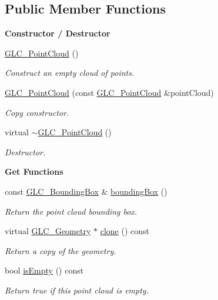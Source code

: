 \subsection*{Public Member Functions}
\begin{Indent}{\bf Constructor / Destructor}\par
\begin{DoxyCompactItemize}
\item 
\hyperlink{class_g_l_c___point_cloud_a567481289d64971308ec9a3db305af8c}{G\-L\-C\-\_\-\-Point\-Cloud} ()
\begin{DoxyCompactList}\small\item\em Construct an empty cloud of points. \end{DoxyCompactList}\item 
\hyperlink{class_g_l_c___point_cloud_a8ee88c1c53313b5fdcfd7af338e7f076}{G\-L\-C\-\_\-\-Point\-Cloud} (const \hyperlink{class_g_l_c___point_cloud}{G\-L\-C\-\_\-\-Point\-Cloud} \&point\-Cloud)
\begin{DoxyCompactList}\small\item\em Copy constructor. \end{DoxyCompactList}\item 
virtual \hyperlink{class_g_l_c___point_cloud_a7b27d306ba660757592ac3a547071328}{$\sim$\-G\-L\-C\-\_\-\-Point\-Cloud} ()
\begin{DoxyCompactList}\small\item\em Destructor. \end{DoxyCompactList}\end{DoxyCompactItemize}
\end{Indent}
\begin{Indent}{\bf Get Functions}\par
\begin{DoxyCompactItemize}
\item 
const \hyperlink{class_g_l_c___bounding_box}{G\-L\-C\-\_\-\-Bounding\-Box} \& \hyperlink{class_g_l_c___point_cloud_aa03e35df98ecdb2b1e26899e12b37240}{bounding\-Box} ()
\begin{DoxyCompactList}\small\item\em Return the point cloud bounding box. \end{DoxyCompactList}\item 
virtual \hyperlink{class_g_l_c___geometry}{G\-L\-C\-\_\-\-Geometry} $\ast$ \hyperlink{class_g_l_c___point_cloud_a2d7c2bf1b82f349f23508b31145622c3}{clone} () const 
\begin{DoxyCompactList}\small\item\em Return a copy of the geometry. \end{DoxyCompactList}\item 
bool \hyperlink{class_g_l_c___point_cloud_aa7c93bd6a00a32ae6e7d3978aa43f66a}{is\-Empty} () const 
\begin{DoxyCompactList}\small\item\em Return true if this point cloud is empty. \end{DoxyCompactList}\end{DoxyCompactItemize}
\end{Indent}
